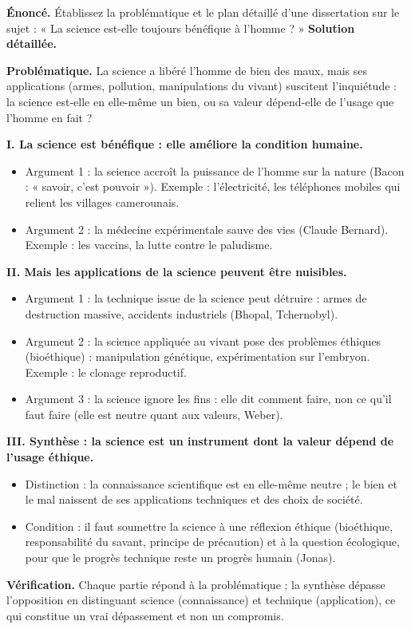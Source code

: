 \documentclass[11pt]{article}
\begin{document}
\begin{exoresolu}
\textbf{Énoncé.} Établissez la problématique et le plan détaillé d'une dissertation sur le sujet : « La science est-elle toujours bénéfique à l'homme ? »
\tcblower
\textbf{Solution détaillée.}

\textbf{Problématique.} La science a libéré l'homme de bien des maux, mais ses applications (armes, pollution, manipulations du vivant) suscitent l'inquiétude : la science est-elle en elle-même un bien, ou sa valeur dépend-elle de l'usage que l'homme en fait ?

\textbf{I. La science est bénéfique : elle améliore la condition humaine.}
\begin{itemize}
\item Argument 1 : la science accroît la puissance de l'homme sur la nature (Bacon : « savoir, c'est pouvoir »). Exemple : l'électricité, les téléphones mobiles qui relient les villages camerounais.
\item Argument 2 : la médecine expérimentale sauve des vies (Claude Bernard). Exemple : les vaccins, la lutte contre le paludisme.
\end{itemize}

\textbf{II. Mais les applications de la science peuvent être nuisibles.}
\begin{itemize}
\item Argument 1 : la technique issue de la science peut détruire : armes de destruction massive, accidents industriels (Bhopal, Tchernobyl).
\item Argument 2 : la science appliquée au vivant pose des problèmes éthiques (bioéthique) : manipulation génétique, expérimentation sur l'embryon. Exemple : le clonage reproductif.
\item Argument 3 : la science ignore les fins : elle dit comment faire, non ce qu'il faut faire (elle est neutre quant aux valeurs, Weber).
\end{itemize}

\textbf{III. Synthèse : la science est un instrument dont la valeur dépend de l'usage éthique.}
\begin{itemize}
\item Distinction : la connaissance scientifique est en elle-même neutre ; le bien et le mal naissent de ses applications techniques et des choix de société.
\item Condition : il faut soumettre la science à une réflexion éthique (bioéthique, responsabilité du savant, principe de précaution) et à la question écologique, pour que le progrès technique reste un progrès humain (Jonas).
\end{itemize}

\textbf{Vérification.} Chaque partie répond à la problématique ; la synthèse dépasse l'opposition en distinguant science (connaissance) et technique (application), ce qui constitue un vrai dépassement et non un compromis.
\end{exoresolu}
\end{document}
